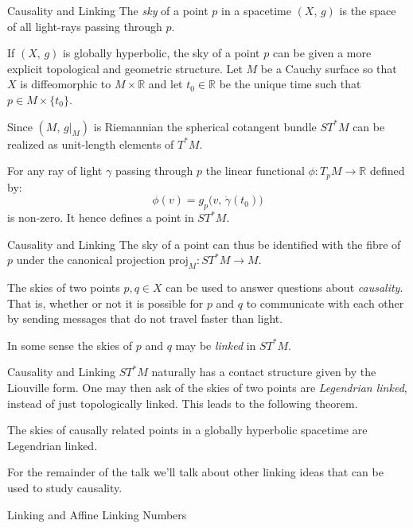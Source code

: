 \documentclass{beamer}
\begin{document}
    \begin{frame}{Causality and Linking}
        The \textit{sky} of a point $p$ in a spacetime $(X,\,g)$ is the space
        of all light-rays passing through $p$.
        \par\hfill\par
        If $(X,\,g)$ is globally hyperbolic, the sky of a point $p$ can be given
        a more explicit topological and geometric structure. Let $M$ be a
        Cauchy surface so that $X$ is diffeomorphic to $M\times\mathbb{R}$ and
        let $t_{0}\in\mathbb{R}$ be the unique time such that
        $p\in{M}\times\{t_{0}\}$.
        \par\hfill\par
        Since $(M,\,g|_{M})$ is Riemannian the spherical cotangent bundle
        $ST^{*}M$ can be realized as unit-length elements of $T^{*}M$.
        \par\hfill\par
        For any ray of light $\gamma$ passing through $p$ the linear functional
        $\phi:T_{p}M\rightarrow\mathbb{R}$ defined by:
        \begin{equation}
            \phi(v)=g_{p}\big(v,\,\dot{\gamma}(t_{0})\big)
        \end{equation}
        is non-zero. It hence defines a point in $ST^{*}M$.
    \end{frame}
    \begin{frame}{Causality and Linking}
        The sky of a point can thus be identified with the fibre of $p$ under
        the canonical projection $\textrm{proj}_{M}:ST^{*}M\rightarrow{M}$.
        \par\hfill\par
        The skies of two points $p,q\in{X}$ can be used to answer questions
        about \textit{causality}. That is, whether or not it is possible for
        $p$ and $q$ to communicate with each other by sending messages that
        do not travel faster than light.
        \par\hfill\par
        In some sense the skies of $p$ and $q$ may be \textit{linked} in
        $ST^{*}M$.
    \end{frame}
    \begin{frame}{Causality and Linking}
        $ST^{*}M$ naturally has a contact structure given by the Liouville
        form. One may then ask of the skies of two points are
        \textit{Legendrian linked}, instead of just topologically linked.
        This leads to the following theorem.
        \begin{theorem}
            The skies of causally related points in a globally hyperbolic
            spacetime are Legendrian linked.
        \end{theorem}
        For the remainder of the talk we'll talk about other linking ideas that
        can be used to study causality.
    \end{frame}
    \begin{frame}{Linking and Affine Linking Numbers}
    \end{frame}
\end{document}
